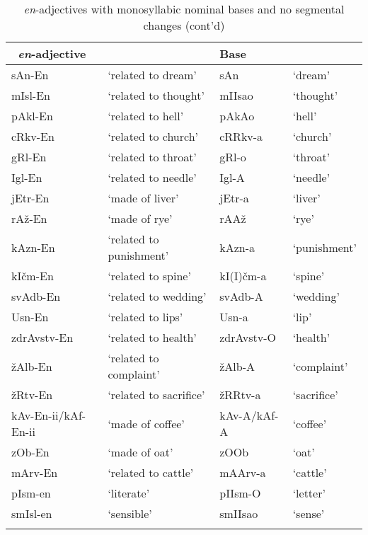 \documentclass[output=paper]{langsci/langscibook}
\begin{document}
\begin{table}     
\caption{\textit{en}-adjectives with monosyllabic nominal bases and no segmental changes (cont'd)}          
\label{tabapp9}          
 \begin{tabular}{ l l l l}          
\lsptoprule            
\ \textit{en}-adjective &  & Base &   
\\ 
\hline
sAn-En & `related to dream' & sAn & `dream' 
\\  mIsl-En & `related to thought' & mIIsao & `thought' 
\\  pAkl-En & `related to hell' & pAkAo & `hell' 
\\  cRkv-En & `related to church' & cRRkv-a & `church' 
\\  gRl-En & `related to throat' & gRl-o & `throat' 
\\  Igl-En & `related to needle' & Igl-A & `needle' 
\\  jEtr-En & `made of liver' & jEtr-a & `liver' 
\\  rAž-En & `made of rye' & rAAž & `rye' 
\\  kAzn-En & `related to punishment' & kAzn-a & `punishment' 
\\  kIčm-En  & `related to spine' & kI(I)čm-a & `spine' 
\\  svAdb-En & `related to wedding' & svAdb-A & `wedding' 
\\  Usn-En & `related to lips' & Usn-a & `lip' 
\\  zdrAvstv-En & `related to health' & zdrAvstv-O & `health' 
\\  žAlb-En & `related to complaint' & žAlb-A & `complaint' 
\\  žRtv-En & `related to sacrifice' & žRRtv-a & `sacrifice' 
\\  kAv-En-ii/kAf-En-ii & `made of coffee' & kAv-A/kAf-A & `coffee' 
\\  zOb-En & `made of oat' & zOOb & `oat' 
\\  mArv-En & `related to cattle' & mAArv-a & `cattle' 
\\  pIsm-en & `literate' & pIIsm-O & `letter' 
\\  smIsl-en & `sensible' & smIIsao & `sense' 
\\
 \lspbottomrule         
 \end{tabular}          
\end{table}           
          
\end{document}
